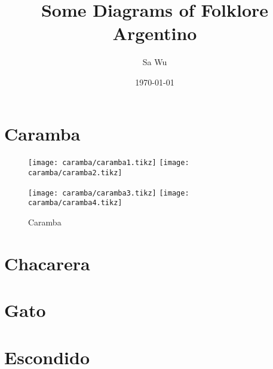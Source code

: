 

\newcommand{\unita}{20}
\newcommand{\unitb}{14}
\newcommand{\separation}{0.5}
\newcommand{\padding}{4}

\newcommand{\arrowlength}{8pt}
\newcommand{\arrowwidth}{6pt}
\newcommand{\nodesize}{6pt}
\newcommand{\returnoffset}{0.1}
\newcommand{\colora}{green}
\newcommand{\colorb}{blue}



\title{Some Diagrams of Folklore Argentino}
\author{Sa Wu}
\date{\today}



\maketitle

\clearpage
\section{Caramba}
\label{sec:caramba}

\begin{figure}[h]
	\texttt{[image: caramba/caramba1.tikz]}
	\hspace*{\fill}
	\texttt{[image: caramba/caramba2.tikz]}

	\texttt{[image: caramba/caramba3.tikz]}
	\hspace*{\fill}
	\texttt{[image: caramba/caramba4.tikz]}
	\caption{Caramba}
	\label{fig:caramba}
\end{figure}

\FloatBarrier
\section{Chacarera}
\label{sec:chacarera}

\FloatBarrier
\section{Gato}

\FloatBarrier
\section{Escondido}

